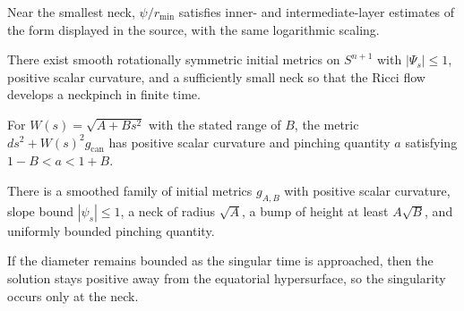 \begin{lemma}
\label{ch02-lem-neckpinch-neck-profile-estimates}

Near the smallest neck, \(\psi/r_{\min}\) satisfies inner- and
intermediate-layer estimates of the form displayed in the source, with the
same logarithmic scaling.
\end{lemma}

\begin{proposition}
\label{ch02-prop-neckpinch-happen}

There exist smooth rotationally symmetric initial metrics on \(S^{n+1}\) with
\(|\Psi_s|\le 1\), positive scalar curvature, and a sufficiently small neck so
that the Ricci flow develops a neckpinch in finite time.
\end{proposition}

\begin{lemma}
\label{ch02-lem-neckpinch-bump-model}

For \(W(s)=\sqrt{A+Bs^2}\) with the stated range of \(B\), the metric
\(ds^2+W(s)^2g_{\mathrm{can}}\) has positive scalar curvature and pinching
quantity \(a\) satisfying \(1-B<a<1+B\).
\end{lemma}

\begin{lemma}
\label{ch02-lem-neckpinch-initial-family}

There is a smoothed family of initial metrics \(g_{A,B}\) with positive scalar
curvature, slope bound \(|\psi_s|\le 1\), a neck of radius \(\sqrt A\), a bump
of height at least \(A\sqrt B\), and uniformly bounded pinching quantity.
\end{lemma}

\begin{proposition}
\label{ch02-prop-single-point-pinching}

If the diameter remains bounded as the singular time is approached, then the
solution stays positive away from the equatorial hypersurface, so the
singularity occurs only at the neck.
\end{proposition}

